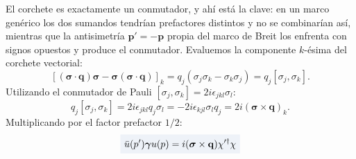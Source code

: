 \documentclass[10pt,a4paper]{article}
\newcommand{\dest}[1]{{\setlength{\fboxsep}{4pt}\colorbox{colordest}{$\displaystyle #1$}}}
\begin{document}
El corchete es exactamente un conmutador, y ahí está la clave: en un marco genérico los dos sumandos tendrían prefactores distintos y no se combinarían así, mientras que la antisimetría $\mathbf{p}' = -\mathbf{p}$ propia del marco de Breit los enfrenta con signos opuestos y produce el conmutador. Evaluemos la componente $k$-ésima del corchete vectorial:
\begin{equation}
\left[ (\boldsymbol{\sigma} \cdot \mathbf{q})\boldsymbol{\sigma} - \boldsymbol{\sigma}(\boldsymbol{\sigma} \cdot \mathbf{q}) \right]_k = q_j (\sigma_j \sigma_k - \sigma_k \sigma_j) = q_j [\sigma_j, \sigma_k].
\end{equation}
Utilizando el conmutador de Pauli $[\sigma_j, \sigma_k] = 2i \epsilon_{jkl} \sigma_l$:
\begin{equation}
q_j [\sigma_j, \sigma_k] = 2i \epsilon_{jkl} q_j \sigma_l = -2i \epsilon_{kjl} \sigma_l q_j = 2i (\boldsymbol{\sigma} \times \mathbf{q})_k.
\end{equation}
Multiplicando por el factor prefactor $1/2$:
\begin{equation}
\dest{\bar{u}(p') \boldsymbol{\gamma} u(p) = i (\boldsymbol{\sigma} \times \mathbf{q}) \chi'^\dagger \chi}
\label{eq:breit_gamma_vec_exact}
\end{equation}
\end{document}
